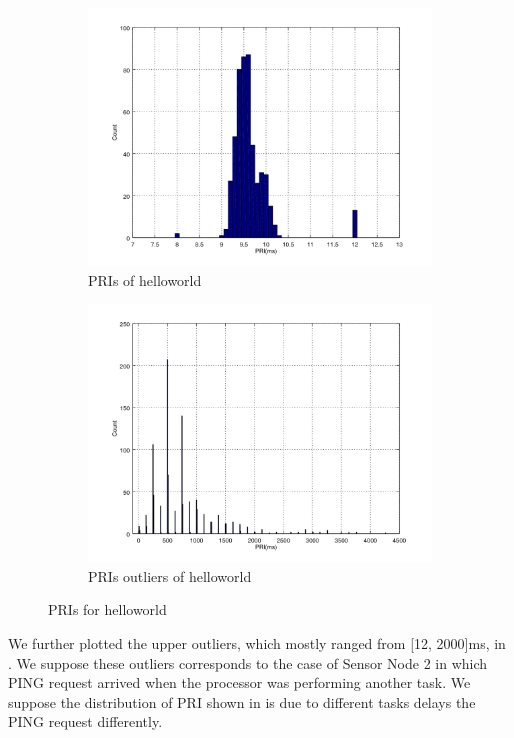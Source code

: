 \begin{figure}[!h]
	\centering
	\begin{subfigure}{0.45\textwidth}
		\includegraphics[width=\textwidth]{fig/helloworld_cc2538.png}
		\caption{PRIs of helloworld\label{HelloworldPri}}
	\end{subfigure}
	\begin{subfigure}{0.45\textwidth}
		\includegraphics[width=\textwidth]{fig/helloworld_cc2538_outlier.png}
		\caption{PRIs outliers of helloworld\label{HelloworldPriOutliers}}
	\end{subfigure}
	\caption{PRIs for helloworld}
\end{figure}

We further plotted the upper outliers, which mostly ranged from [12, 2000]ms, in . We suppose these outliers corresponds to the case of Sensor Node 2 in  which PING request arrived when the processor was performing another task. We suppose the distribution of PRI shown in  is due to different tasks delays the PING request differently.

